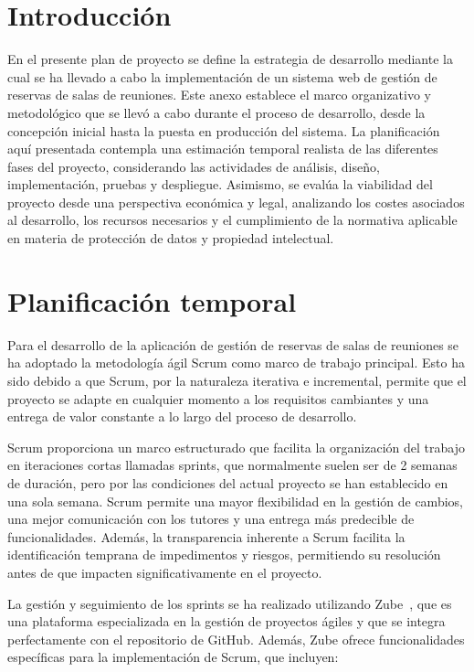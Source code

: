 
\section{Introducción}
En el presente plan de proyecto se define la estrategia de desarrollo mediante la cual se ha llevado a cabo la implementación de un sistema web de gestión de reservas de salas de reuniones. Este anexo establece el marco organizativo y metodológico que se llevó a cabo durante el proceso de desarrollo, desde la concepción inicial hasta la puesta en producción del sistema. La planificación aquí presentada contempla una estimación temporal realista de las diferentes fases del proyecto, considerando las actividades de análisis, diseño, implementación, pruebas y despliegue. Asimismo, se evalúa la viabilidad del proyecto desde una perspectiva económica y legal, analizando los costes asociados al desarrollo, los recursos necesarios y el cumplimiento de la normativa aplicable en materia de protección de datos y propiedad intelectual.

\section{Planificación temporal}
Para el desarrollo de la aplicación de gestión de reservas de salas de reuniones se ha adoptado la metodología ágil Scrum como marco de trabajo principal. Esto ha sido debido a que Scrum, por la naturaleza iterativa e incremental, permite que el proyecto se adapte en cualquier momento a los requisitos cambiantes y una entrega de valor constante a lo largo del proceso de desarrollo.

Scrum proporciona un marco estructurado que facilita la organización del trabajo en iteraciones cortas llamadas sprints, que normalmente suelen ser de 2 semanas de duración, pero por las condiciones del actual proyecto se han establecido en una sola semana. Scrum permite una mayor flexibilidad en la gestión de cambios, una mejor comunicación con los tutores y una entrega más predecible de funcionalidades. Además, la transparencia inherente a Scrum facilita la identificación temprana de impedimentos y riesgos, permitiendo su resolución antes de que impacten significativamente en el proyecto.

La gestión y seguimiento de los sprints se ha realizado utilizando Zube~\cite{zube}, que es una plataforma especializada en la gestión de proyectos ágiles y que se integra perfectamente con el repositorio de GitHub. Además, Zube ofrece funcionalidades específicas para la implementación de Scrum, que incluyen:

